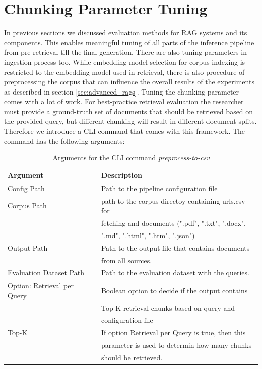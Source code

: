 \section{Chunking Parameter Tuning}

In previous sections we discussed evaluation methods for RAG systems and its components. This enables meaningful tuning of all parts of the inference pipeline from pre-retrieval till the final generation. There are also tuning parameters in ingestion process too. While embedding model selection for corpus indexing is restricted to the embedding model used in retrieval, there is also procedure of preprocessing the corpus that can influence the overall results of the experiments as described in section \ref{sec:advanced_rags}. 
Tuning the chunking parameter comes with a lot of work. For best-practice retrieval evaluation the researcher must provide a ground-truth set of documents that should be retrieved based on the provided query, but different chunking will result in different document splits. Therefore we introduce a CLI command that comes with this framework. The command has the following arguments:

{\renewcommand{\arraystretch}{1.5}%
\begin{table}
  \centering
 \begin{tabular}{|l|l|}
  \hline
  \textbf{Argument} & \textbf{Description} \\[3pt]

  \hline Config Path & Path to the pipeline configuration file\\[2pt]

  \hline Corpus Path & path to the corpus directoy containing urls.csv for\\[2pt]
  &  fetching and documents (".pdf", ".txt", ".docx", \\[2pt] & ".md", ".html", ".htm", ".json") \\[2pt]
  
  \hline Output Path & Path to the output file that contains documents \\[2pt] 
  & from all sources.\\[2pt]
  
  \hline Evaluation Dataset Path & Path to the evaluation dataset with the queries.\\[2pt]
  
  \hline Option: Retrieval per Query & Boolean option to decide if the output contains \\[2pt]
  & Top-K retrieval chunks based on query and \\[2pt]
  & configuration file\\[2pt]

  \hline Top-K & If option Retrieval per Query is true, then this\\[2pt]
  & parameter is used to determin how many chunks \\[2pt] 
  & should be retrieved.\\[2pt]

  \hline
 \end{tabular}
 \caption{Arguments for the CLI command \textit{preprocess-to-csv}}
 \label{table:preprocess-cmd}
\end{table}}

